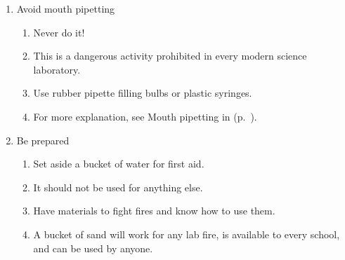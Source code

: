 \begin{enumerate}
\item{Avoid mouth pipetting}
\begin{enumerate}
\item{Never do it!}
\item{This is a dangerous activity 
prohibited in every modern science laboratory.}
\item{Use rubber pipette filling bulbs or plastic syringes.}
\item{For more explanation, see Mouth pipetting in  (p.~\pageref{cha:dangertech}).}
\end{enumerate}

\item{Be prepared}
\begin{enumerate}
\item{Set aside a bucket of water for first aid.}
\item{It should not be used for anything else.}
\item{Have materials to fight fires and know how to use them.}
\item{A bucket of sand will work for any lab fire, 
is available to every school, and can be used by anyone.}
\end{enumerate}


\end{enumerate}
